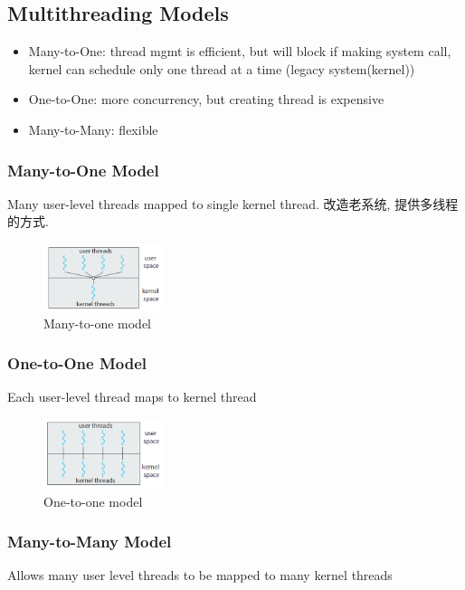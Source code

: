 \subsection{Multithreading Models}
\begin{itemize}\small
    \item Many-to-One: thread mgmt is efficient, but will block if making system call, kernel can schedule only one thread at a time (legacy system(kernel))
    \item One-to-One: more concurrency, but creating thread is expensive
    \item Many-to-Many: flexible    
\end{itemize}

\subsubsection{Many-to-One Model}
Many user-level threads mapped to single kernel thread. 改造老系统, 提供多线程的方式. 
\begin{figure}[!htb]
    \centering
    \includegraphics[width=0.309\textwidth]{pic/OS4/Many-to-one model.png}
    \caption{Many-to-one model}
\end{figure}

\subsubsection{One-to-One Model}
Each user-level thread maps to kernel thread

\begin{figure}[!htb]
    \centering
    \includegraphics[width=0.309\textwidth]{pic/OS4/One-to-one model.png}
    \caption{One-to-one model}
\end{figure}

\subsubsection{Many-to-Many Model}
Allows many user level threads to be mapped to many kernel threads

